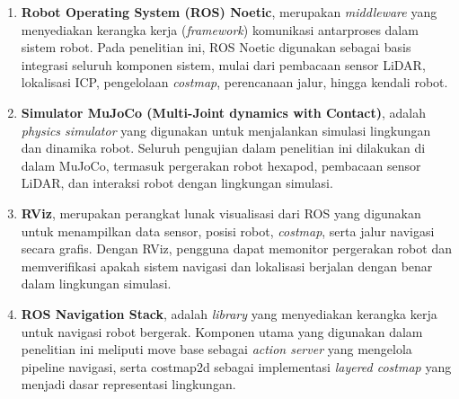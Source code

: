 \begin{enumerate}
  \item \textbf{Robot Operating System (ROS) Noetic},
  merupakan \emph{middleware} yang menyediakan kerangka kerja
  (\emph{framework}) komunikasi antarproses dalam sistem robot.
  Pada penelitian ini, ROS Noetic digunakan sebagai basis integrasi
  seluruh komponen sistem, mulai dari pembacaan sensor LiDAR,
  lokalisasi ICP, pengelolaan \emph{costmap}, perencanaan jalur,
  hingga kendali robot.

  \item \textbf{Simulator MuJoCo (Multi-Joint dynamics with Contact)}, adalah \emph{physics simulator} yang digunakan untuk
  menjalankan simulasi lingkungan dan dinamika robot. Seluruh
  pengujian dalam penelitian ini dilakukan di dalam MuJoCo, termasuk
  pergerakan robot hexapod, pembacaan sensor LiDAR, dan interaksi
  robot dengan lingkungan simulasi.

  \item \textbf{RViz}, merupakan perangkat lunak visualisasi
  dari ROS yang digunakan untuk menampilkan data sensor, posisi
  robot, \emph{costmap}, serta jalur navigasi secara grafis.
  Dengan RViz, pengguna dapat memonitor pergerakan robot dan
  memverifikasi apakah sistem navigasi dan lokalisasi berjalan
  dengan benar dalam lingkungan simulasi.

  \item \textbf{ROS Navigation Stack}, adalah
  \emph{library} yang menyediakan kerangka kerja untuk navigasi
  robot bergerak. Komponen utama yang digunakan dalam penelitian ini
  meliputi move base sebagai \emph{action server} yang
  mengelola pipeline navigasi, serta costmap2d sebagai
  implementasi \emph{layered costmap} yang menjadi dasar representasi
  lingkungan.
\end{enumerate}



